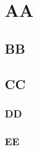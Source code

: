 \documentclass{article}
\begin{document}
    \section{AA}
    \subsection{BB}
    \subsection{CC}
    \subsubsection{DD}
    \subsubsection{EE}
\end{document}
